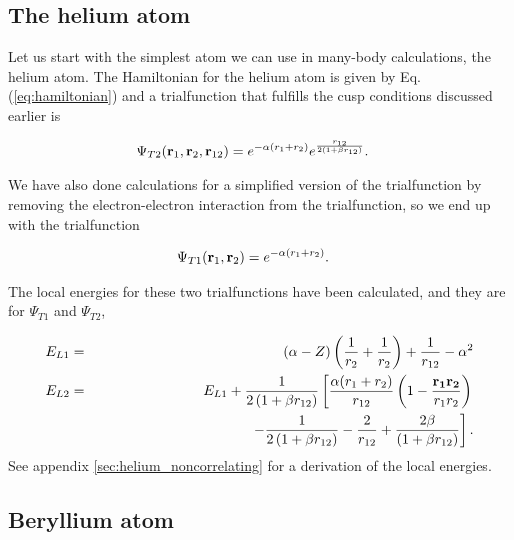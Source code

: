 	\subsection{The helium atom}
		Let us start with the simplest atom we can use in many-body calculations, the helium atom. The Hamiltonian for the helium atom is given by Eq. (\ref{eq:hamiltonian}) and a trialfunction that fulfills the cusp conditions discussed earlier is

		\begin{align}
			\Psi_{T2}(\vb{r}_1, \vb{r}_2, \vb{r}_{12}) &=  e^{ -\alpha(r_1 + r_2)} e^{\frac{ r_{12}}{2(1 + \beta r_{12})}}.
		\end{align}

		We have also done calculations for a simplified version of the trialfunction by removing the electron-electron interaction from the trialfunction, so we end up with the trialfunction

		\begin{align}
			\Psi_{T1}(\vb{r}_1, \vb{r}_2) &=  e^{ -\alpha(r_1 + r_2)}.
		\end{align}

		The local energies for these two trialfunctions have been calculated, and they are for \(\Psi_{T1} \) and \(\Psi_{T2}\),

		\begin{eqnarray*}
			E_{L1} & = & (\alpha - Z)\left( \frac{1}{r_2} + \frac{1}{r_2} \right) + \frac{1}{r_{12}} - \alpha ^2
			\\
			E_{L2} & = & E_{L1} + \frac{1}{2\left(1+\beta r_{12}\right)} \left[ \frac{\alpha(r_1 + r_2)}{r_{12}}\left( 1 - \frac{\vb{r_1}\vb{r_2}}{r_1 r_2} \right)\right.\\
			  & & \hspace{110pt}\left.-  \frac{1}{2\left(1+\beta r_{12}\right)} - \frac{2}{r_{12}} +  \frac{2\beta}{\left(1+\beta r_{12}\right)} \right].
		\end{eqnarray*}
		See appendix \ref{sec:helium_noncorrelating} for a derivation of the local energies.


	\subsection{Beryllium atom}

